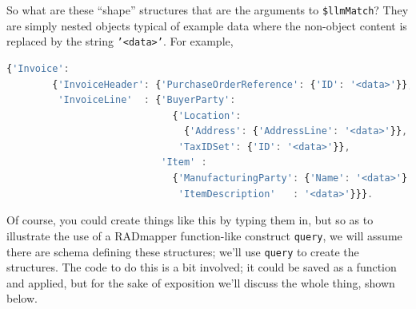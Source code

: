 \documentclass[10pt,letterpaper]{article} %
\newcommand{\stt}[1]{\texttt{#1}} %
\begin{document}
So what are these ``shape'' structures that are the arguments to \stt{\$llmMatch}?
They are simply nested objects typical of example data where the non-object content is replaced by the string \stt{'<data>'}.
For example,

\begin{lstlisting}[language=JavaScript,numbers=none,basicstyle=\ttfamily\scriptsize]
      {'Invoice':
        {'InvoiceHeader': {'PurchaseOrderReference': {'ID': '<data>'}},
         'InvoiceLine'  : {'BuyerParty':
                             {'Location':
                               {'Address': {'AddressLine': '<data>'}},
                              'TaxIDSet': {'ID': '<data>'}},
                           'Item' :
                             {'ManufacturingParty': {'Name': '<data>'}
                              'ItemDescription'   : '<data>'}}}.
\end{lstlisting} \vspace{-2em}
Of course, you could create things like this by typing them in, but so as to illustrate the use of a RADmapper function-like construct \stt{query}, we will assume there are schema defining these structures; we'll use \stt{query} to create the structures. The code to do this is a bit involved; it could be saved as a function and applied, but for the sake of exposition we'll discuss the whole thing, shown below.
\end{document}
